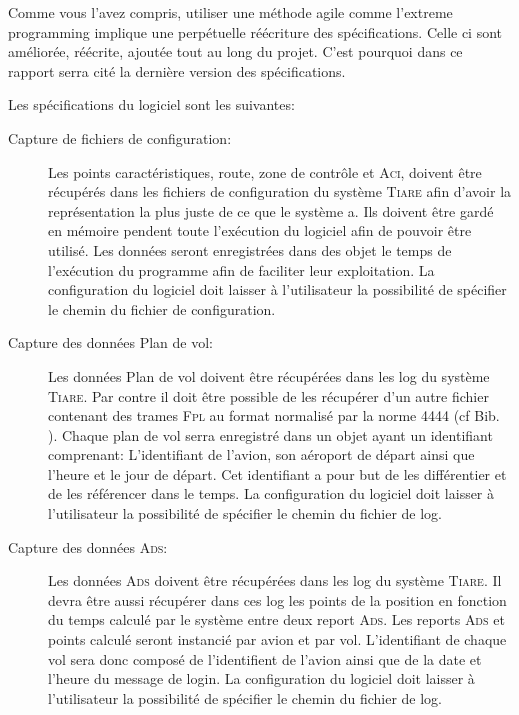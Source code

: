 

Comme vous l'avez compris, utiliser une méthode agile comme l'extreme programming  implique une perpétuelle réécriture des spécifications. Celle ci sont améliorée, réécrite, ajoutée tout au long du projet. C'est pourquoi dans ce rapport serra cité la dernière version des spécifications.

Les spécifications du logiciel sont les suivantes:
\begin{description}
    \item[Capture de fichiers de configuration:] Les points caractéristiques, route, zone de contrôle et \textsc{Aci}, doivent être récupérés dans les fichiers de configuration du système \textsc{Tiare} afin d'avoir la représentation la plus juste de ce que le système a. Ils doivent être gardé en mémoire pendent toute l'exécution du logiciel afin de pouvoir être utilisé. Les données seront enregistrées dans des objet le temps de l'exécution du programme afin de faciliter leur exploitation. La configuration du logiciel doit laisser à l'utilisateur la possibilité de spécifier le chemin du fichier de configuration.

    \item[Capture des données Plan de vol:] Les données Plan de vol doivent être récupérées dans les log du système \textsc{Tiare}. Par contre il doit être possible de les récupérer d'un autre fichier contenant des trames \textsc{Fpl} au format normalisé par la norme 4444 (cf Bib. \cite{4444}). Chaque plan de vol serra enregistré dans un objet ayant un identifiant comprenant: L'identifiant de l'avion, son aéroport de départ ainsi que l'heure et le jour de départ. Cet identifiant a pour but de les différentier et de les référencer dans le temps. La configuration du logiciel doit laisser à l'utilisateur la possibilité de spécifier le chemin du fichier de log.

    \item[Capture des données \textsc{Ads}:] Les données \textsc{Ads} doivent être récupérées dans les log du système \textsc{Tiare}. Il devra être aussi récupérer dans ces log les points de la position en fonction du temps calculé par le système entre deux report \textsc{Ads}. Les reports \textsc{Ads} et points calculé seront instancié par avion et par vol. L'identifiant de chaque vol sera donc composé de l'identifient de l'avion ainsi que de la date et l'heure du message de login. La configuration du logiciel doit laisser à l'utilisateur la possibilité de spécifier le chemin du fichier de log.


\end{description}
